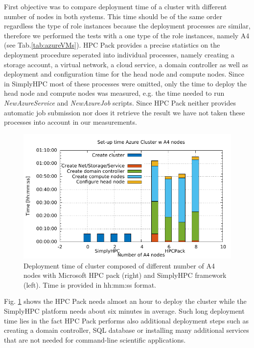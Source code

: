 \documentclass[3p,times]{elsarticle}
\begin{document}
 
First objective was to compare deployment time of a cluster with different number of nodes in both systems. This time should be of the same order regardless the type of role instances because the deployment processes are similar, therefore we performed the tests with a one type of the role instances, namely A4 (see Tab.\ref{tab:azureVMs}). HPC Pack provides a precise statistics on the deployment procedure seperated into individual processes, namely creating a storage account, a virtual network, a cloud service, a domain controller as well as  deployment and configuration time for the head node and compute nodes. Since in SimplyHPC most of these processes were omitted, only the time to deploy the head node and compute nodes was measured, e.g. the time needed to run \textit{NewAzureService} and \textit{NewAzureJob} scripts. Since HPC Pack neither provides automatic job submission nor does it retrieve the result we have not taken these processes into account in our measurements. 


\begin{figure}
\centering

  \includegraphics[width=.6\linewidth]{gplt-creation-simplyvshpc}


\caption{Deployment time of cluster composed of different number of A4 nodes with Microsoft HPC pack (right) and SimplyHPC framework (left). Time is provided in hh:mm:ss format.}
\label{fig:deployTime}
\end{figure}

Fig. \ref{fig:deployTime} shows the HPC Pack needs almost an hour to deploy the cluster while the SimplyHPC platform needs about six minutes in average. Such long deployment time lies in the fact HPC Pack performs also additional deployment steps such as creating a domain controller, SQL database or installing many additional services that are not needed for command-line scientific applications.
\end{document}
